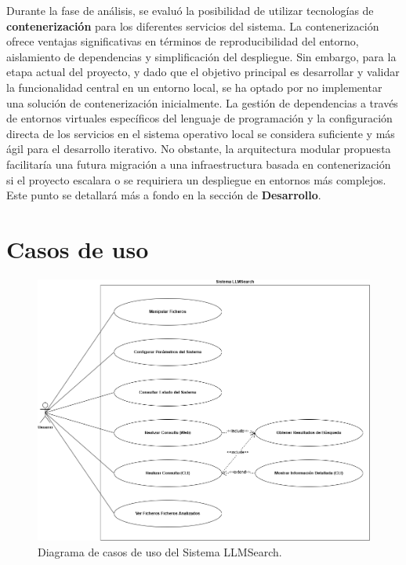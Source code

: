 Durante la fase de análisis, se evaluó la posibilidad de utilizar tecnologías de \textbf{contenerización} para los diferentes servicios del sistema. La contenerización ofrece ventajas significativas en términos de reproducibilidad del entorno, aislamiento de dependencias y simplificación del despliegue. Sin embargo, para la etapa actual del proyecto, y dado que el objetivo principal es desarrollar y validar la funcionalidad central en un entorno local, se ha optado por no implementar una solución de contenerización inicialmente. La gestión de dependencias a través de entornos virtuales específicos del lenguaje de programación y la configuración directa de los servicios en el sistema operativo local se considera suficiente y más ágil para el desarrollo iterativo. No obstante, la arquitectura modular propuesta facilitaría una futura migración a una infraestructura basada en contenerización si el proyecto escalara o se requiriera un despliegue en entornos más complejos. Este punto se detallará más a fondo en la sección de \textbf{Desarrollo}.
\section{Casos de uso}
\label{sec:casos_de_uso}

\begin{figure}[H]
\centering
\includegraphics[width=\textwidth]{archivos/casos_de_uso.png}
\caption[Diagrama de Casos de Uso de LLMSearch]{Diagrama de casos de uso del Sistema LLMSearch.}
\label{fig:casos_de_uso}
\end{figure}

